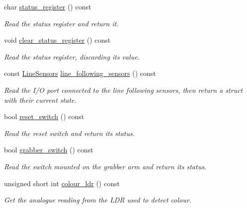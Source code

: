 \begin{DoxyCompactItemize}
char \hyperlink{classIDP_1_1HardwareAbstractionLayer_a4867c291e34794d1bb9c0929d5514c5b}{status\_\-register} () const 
\begin{DoxyCompactList}\small\item\em Read the status register and return it. \item\end{DoxyCompactList}\item 
void \hyperlink{classIDP_1_1HardwareAbstractionLayer_a1902d9260758777966ab362e21f3be42}{clear\_\-status\_\-register} () const 
\begin{DoxyCompactList}\small\item\em Read the status register, discarding its value. \item\end{DoxyCompactList}\item 
const \hyperlink{structIDP_1_1LineSensors}{LineSensors} \hyperlink{classIDP_1_1HardwareAbstractionLayer_aca143d627de2ff9942069ad922d17ee5}{line\_\-following\_\-sensors} () const 
\begin{DoxyCompactList}\small\item\em Read the I/O port connected to the line following sensors, then return a struct with their current state. \item\end{DoxyCompactList}\item 
bool \hyperlink{classIDP_1_1HardwareAbstractionLayer_a4ce4bec948d6449e7cab3cfcd0de513f}{reset\_\-switch} () const 
\begin{DoxyCompactList}\small\item\em Read the reset switch and return its status. \item\end{DoxyCompactList}\item 
bool \hyperlink{classIDP_1_1HardwareAbstractionLayer_a82ef6744041c174edb7f8982f44685b7}{grabber\_\-switch} () const 
\begin{DoxyCompactList}\small\item\em Read the switch mounted on the grabber arm and return its status. \item\end{DoxyCompactList}\item 
unsigned short int \hyperlink{classIDP_1_1HardwareAbstractionLayer_ae4f163981d213ff3dea4b21e8aa92063}{colour\_\-ldr} () const 
\begin{DoxyCompactList}\small\item\em Get the analogue reading from the LDR used to detect colour. \item\end{DoxyCompactList}\item 

\end{DoxyCompactItemize}
